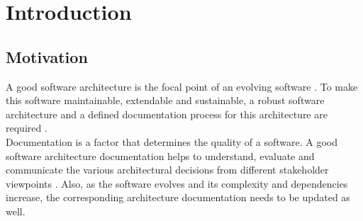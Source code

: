 \chapter{Introduction}\label{chapter:Introduction}

\section{Motivation}\label{sec:motiv}
\indent A good software architecture is the focal point of an evolving software \cite{Garlan2011}.  To make this software maintainable, extendable and sustainable, a robust software architecture and a defined documentation process for this architecture are required \cite{crouch_stephen_software_2013}.
\\\indent Documentation is a factor that determines the quality of a software. A good software architecture documentation helps to understand, evaluate and communicate the various architectural decisions from different stakeholder viewpoints \cite{BachmannDocumentingSoftware2010}. Also, as the software evolves and its complexity and dependencies increase, the corresponding architecture documentation needs to be updated as well\cite{yeates_stuart_OSS_2008}.

